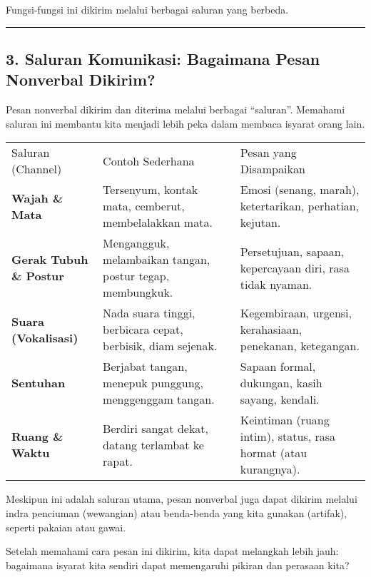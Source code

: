 \documentclass[
  letterpaper,
  DIV=11,
  numbers=noendperiod]{scrreprt}
\begin{document}
Fungsi-fungsi ini dikirim melalui berbagai saluran yang berbeda.

\begin{center}\rule{0.5\linewidth}{0.5pt}\end{center}

\subsection{3. Saluran Komunikasi: Bagaimana Pesan Nonverbal
Dikirim?}\label{saluran-komunikasi-bagaimana-pesan-nonverbal-dikirim}

Pesan nonverbal dikirim dan diterima melalui berbagai ``saluran''.
Memahami saluran ini membantu kita menjadi lebih peka dalam membaca
isyarat orang lain.

\begin{longtable}[]{@{}
  >{\raggedright\arraybackslash}p{}
  >{\raggedright\arraybackslash}p{}
  >{\raggedright\arraybackslash}p{}@{}}
\toprule\noalign{}
\endhead
\bottomrule\noalign{}
\endlastfoot
Saluran (Channel) & Contoh Sederhana & Pesan yang Disampaikan \\
\textbf{Wajah \& Mata} & Tersenyum, kontak mata, cemberut, membelalakkan
mata. & Emosi (senang, marah), ketertarikan, perhatian, kejutan. \\
\textbf{Gerak Tubuh \& Postur} & Mengangguk, melambaikan tangan, postur
tegap, membungkuk. & Persetujuan, sapaan, kepercayaan diri, rasa tidak
nyaman. \\
\textbf{Suara (Vokalisasi)} & Nada suara tinggi, berbicara cepat,
berbisik, diam sejenak. & Kegembiraan, urgensi, kerahasiaan, penekanan,
ketegangan. \\
\textbf{Sentuhan} & Berjabat tangan, menepuk punggung, menggenggam
tangan. & Sapaan formal, dukungan, kasih sayang, kendali. \\
\textbf{Ruang \& Waktu} & Berdiri sangat dekat, datang terlambat ke
rapat. & Keintiman (ruang intim), status, rasa hormat (atau
kurangnya). \\
\end{longtable}

Meskipun ini adalah saluran utama, pesan nonverbal juga dapat dikirim
melalui indra penciuman (wewangian) atau benda-benda yang kita gunakan
(artifak), seperti pakaian atau gawai.

Setelah memahami cara pesan ini dikirim, kita dapat melangkah lebih
jauh: bagaimana isyarat kita sendiri dapat memengaruhi pikiran dan
perasaan kita?
\end{document}

